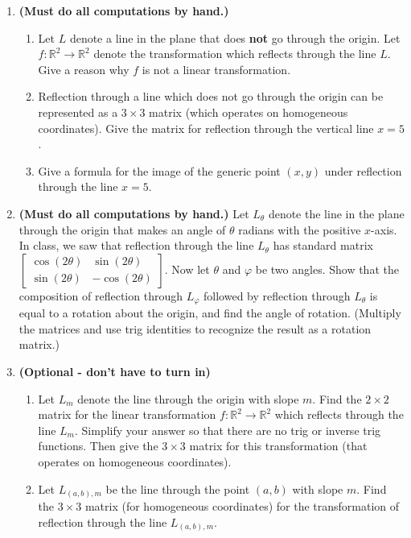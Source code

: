 \documentclass{article}
\newcommand{\R}{\mathbb{R}}
\begin{document}
\begin{enumerate}
	\item \textbf{(Must do all computations by hand.)}
	\begin{enumerate}
		\item Let $L$ denote a line in the plane that does \textbf{not} go through the origin.  Let $f: \R^2 \to \R^2$ denote the transformation which reflects through the line $L$.  Give a reason why $f$ is not a linear transformation.
		\item Reflection through a line which does not go through the origin can be represented as a $3 \times 3$ matrix (which operates on homogeneous coordinates).  Give the matrix for reflection through the vertical line $x=5$.
		\item Give a formula for the image of the generic point $(x,y)$ under reflection through the line $x=5$.
	\end{enumerate}

	\item \textbf{(Must do all computations by hand.)} Let $L_\theta$ denote the line in the plane through the origin that makes an angle of $\theta$ radians with the positive $x$-axis.  In class, we saw that reflection through the line $L_\theta$ has standard matrix $\begin{bmatrix}
	\cos(2\theta) & \sin(2\theta)\\
	\sin(2\theta) & -\cos(2\theta)
	\end{bmatrix}$.  Now let $\theta$ and $\varphi$ be two angles.  Show that the composition of reflection through $L_\varphi$ followed by reflection through $L_\theta$ is equal to a rotation about the origin, and find the angle of rotation.  (Multiply the matrices and use trig identities to recognize the result as a rotation matrix.)

	\item \textbf{(Optional - don't have to turn in)}  
	\begin{enumerate}
		\item Let $L_m$ denote the line through the origin with slope $m$.  Find the $2 \times 2$ matrix for the linear transformation $f: \R^2 \to \R^2$ which reflects through the line $L_m$.  Simplify your answer so that there are no trig or inverse trig functions.  Then give the $3 \times 3$ matrix for this transformation (that operates on homogeneous coordinates).
		\item Let $L_{(a,b),m}$ be the line through the point $(a,b)$ with slope $m$.  Find the $3 \times 3$ matrix (for homogeneous coordinates) for the transformation of reflection through the line $L_{(a,b),m}$.
	\end{enumerate}  

\end{enumerate}
\end{document}
